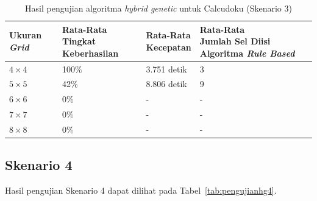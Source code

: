\begin{table}
\centering
\captionsetup{justification=centering}
\caption[Hasil pengujian algoritma \textit{hybrid genetic} untuk Calcudoku (Skenario 3)]{Hasil pengujian algoritma \textit{hybrid genetic} untuk Calcudoku (Skenario 3)}
\begin{tabular}{| l | l | l | l |}
\hline
Ukuran \textit{Grid} & \makecell[l]{Rata-Rata \\ Tingkat Keberhasilan} & \makecell[l]{Rata-Rata \\ Kecepatan} & \makecell[l]{Rata-Rata \\ Jumlah Sel Diisi Algoritma \textit{Rule Based}} \\
\hline \hline
\begin{math}4 \times 4\end{math} & 100\% & 3.751 detik & 3 \\
\hline
\begin{math}5 \times 5\end{math} & 42\% & 8.806 detik & 9 \\
\hline
\begin{math}6 \times 6\end{math} & 0\% & - & - \\
\hline
\begin{math}7 \times 7\end{math} & 0\% & - & - \\
\hline
\begin{math}8 \times 8\end{math} & 0\% & - & - \\
\hline
\end{tabular}
\label{tab:pengujianhg3}
\end{table}

\subsection{Skenario 4}
\label{sec:skenario4}

Hasil pengujian Skenario 4 dapat dilihat pada Tabel~\ref{tab:pengujianhg4}.

